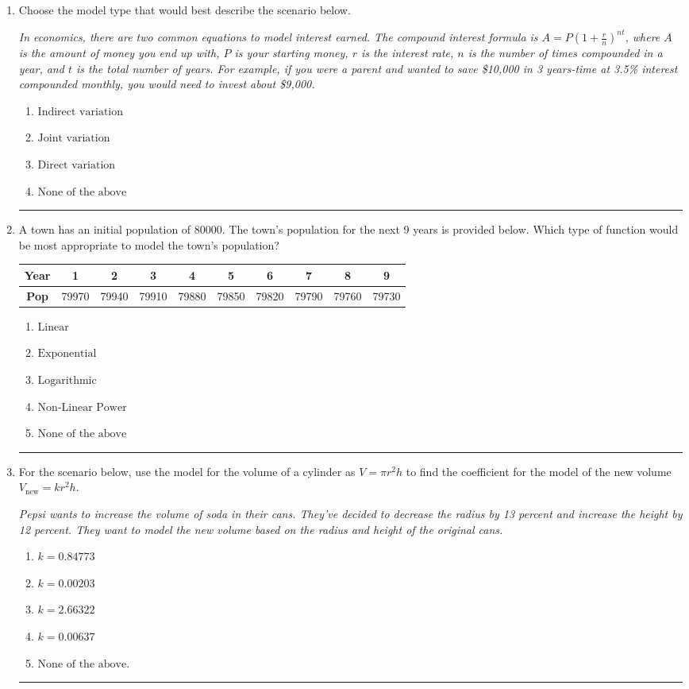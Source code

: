\documentclass[14pt]{extbook}
\newcommand{\litem}[1]{\item#1\hspace*{-1cm}\rule{\textwidth}{0.4pt}}
\begin{document}
\begin{enumerate}
{\begin{enumerate}[label=\Alph*.]
\end{enumerate} }
\litem{
Choose the model type that would best describe the scenario below.
\begin{center}
    \textit{ In economics, there are two common equations to model interest earned. The compound interest formula is $A = P (1 + \frac{r}{n})^{nt}$, where $A$ is the amount of money you end up with, $P$ is your starting money, $r$ is the interest rate, $n$ is the number of times compounded in a year, and $t$ is the total number of years. For example, if you were a parent and wanted to save \$10,000 in 3 years-time at 3.5\% interest compounded monthly, you would need to invest about \$9,000. }
\end{center}
\begin{enumerate}[label=\Alph*.]
\item \( \text{Indirect variation} \)
\item \( \text{Joint variation} \)
\item \( \text{Direct variation} \)
\item \( \text{None of the above} \)

\end{enumerate} }
\litem{
A town has an initial population of 80000. The town's population for the next 9 years is provided below. Which type of function would be most appropriate to model the town's population?

\begin{tabular}{c|c|c|c|c|c|c|c|c|c}
\textbf{Year} &1 &2 &3 &4 &5 &6 &7 &8 &9\tabularnewline \hline
\textbf{Pop} &79970 &79940 &79910 &79880 &79850 &79820 &79790 &79760 &79730\end{tabular}\begin{enumerate}[label=\Alph*.]
\item \( \text{Linear} \)
\item \( \text{Exponential} \)
\item \( \text{Logarithmic} \)
\item \( \text{Non-Linear Power} \)
\item \( \text{None of the above} \)

\end{enumerate} }
\litem{
For the scenario below, use the model for the volume of a cylinder as $V = \pi r^2 h$ to find the coefficient for the model of the new volume $V_{\text{new}} = k r^2 h$.
\begin{center}
    \textit{ Pepsi wants to increase the volume of soda in their cans. They've decided to decrease the radius by 13 percent and increase the height by 12 percent. They want to model the new volume based on the radius and height of the original cans. }
\end{center}
\begin{enumerate}[label=\Alph*.]
\item \( k = 0.84773 \)
\item \( k = 0.00203 \)
\item \( k = 2.66322 \)
\item \( k = 0.00637 \)
\item \( \text{None of the above.} \)


\end{enumerate}}
\end{enumerate}
\end{document}
